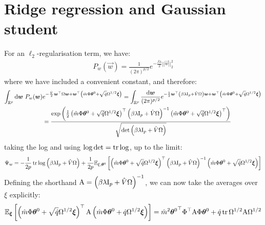 \documentclass[11pt]{article}
\numberwithin{equation}{section}
\begin{document}
\section{Ridge regression and Gaussian student}
For an $\ell_{2}$-regularisation term, we have:
\begin{align}
P_{w}(\vec{w}) = \frac{1}{(2\pi)^{p/2}}e^{-\frac{\beta \lambda}{2}||\vec{w}||_{2}^2}	
\end{align}
\noindent where we have included a convenient constant, and therefore:
\begin{align}
\int_{\mathbb{R}^{p}}\text{d}\bm{w}~P_{w}(\bm{w})&e^{-\frac{\hat{V}}{2}\bm{w}^{\top}\Omega\bm{w}+\bm{w}^{\top}\left(\hat{m}\Phi\bm{\theta}^{0}+\sqrt{\hat{q}}\Omega^{1/2}\bm{\xi}\right)} =\int_{\mathbb{R}^{p}}\frac{\text{d}\bm{w}}{(2\pi)^{p/2}}e^{-\frac{1}{2}\bm{w}^{\top}\left(\beta\lambda\text{I}_{p}+\hat{V}\Omega\right)\bm{w}+\bm{w}^{\top}\left(\hat{m}\Phi\bm{\theta}^{0}+\sqrt{\hat{q}}\Omega^{1/2}\bm{\xi}\right)}\notag\\
&=\frac{\exp\left(\frac{1}{2}\left(\hat{m}\Phi\bm{\theta}^{0}+\sqrt{\hat{q}}\Omega^{1/2}\bm{\xi}\right)^{\top}\left(\beta\lambda\text{I}_{p}+\hat{V}\Omega\right)^{-1}\left(\hat{m}\Phi\bm{\theta}^{0}+\sqrt{\hat{q}}\Omega^{1/2}\bm{\xi}\right)^{\top}\right)}{\sqrt{\det\left(\beta\lambda\text{I}_{p}+\hat{V}\Omega\right)}}
\end{align}
\noindent taking the log and using $\log\det = \tr\log$, up to the limit:
\begin{align}
\Psi_{w} = -\frac{1}{2p}	\tr\log \left(\beta\lambda\text{I}_{p}+\hat{V}\Omega\right)+\frac{1}{2p}\mathbb{E}_{\xi,\bm{\theta}^{0}}\left[\left(\hat{m}\Phi\bm{\theta}^{0}+\sqrt{\hat{q}}\Omega^{1/2}\bm{\xi}\right)^{\top}\left(\beta\lambda\text{I}_{p}+\hat{V}\Omega\right)^{-1}\left(\hat{m}\Phi\bm{\theta}^{0}+\sqrt{\hat{q}}\Omega^{1/2}\bm{\xi}\right)\right]
\end{align}
Defining the shorthand $\text{A} = \left(\beta\lambda\text{I}_{p}+\hat{V}\Omega\right)^{-1}$, we can now take the averages over $\xi$ explicitly:
\begin{align}
	\mathbb{E}_{\bm{\xi}}\left[\left(\hat{m}\Phi\bm{\theta}^{0}+\sqrt{\hat{q}}\Omega^{1/2}\bm{\xi}\right)^{\top}\text{A}\left(\hat{m}\Phi\bm{\theta}^{0}+\hat{q}\Omega^{1/2}\bm{\xi}\right)\right] = \hat{m}^{2}{\bm{\theta}^{0}}^{\top}\Phi^{\top}\text{A}\Phi\bm{\theta}^{0}+\hat{q}\tr\Omega^{1/2}\text{A} \Omega^{1/2}
\end{align}
\end{document}
